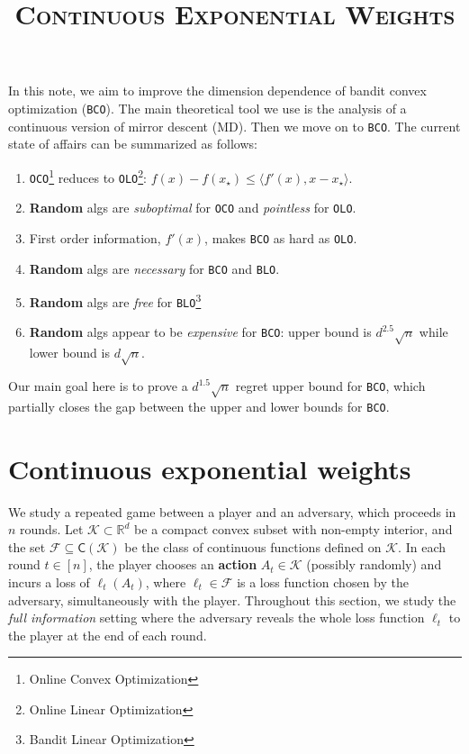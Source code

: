 \documentclass{article}
\title{\textsc{Continuous Exponential Weights}}
\date{}
\theoremstyle{plain}
\theoremstyle{definition}
\theoremstyle{plain}
\newcommand{\R}{\mathbb R}
\newcommand{\K}{\mathcal K}
\newcommand{\cF}{\mathcal F}
\newcommand{\mdalg}{\textsf{MD}\xspace}
\newcommand{\olo}{\texttt{OLO}\xspace}
\newcommand{\bco}{\texttt{BCO}\xspace}
\newcommand{\oco}{\texttt{OCO}\xspace}
\begin{document}
\maketitle

In this note, we aim to improve the dimension dependence of bandit convex optimization (\bco).
The main theoretical tool we use is the analysis of a continuous version of mirror descent (\mdalg).
Then we move on to \bco.
The current state of affairs can be summarized as follows:
\begin{enumerate}
    \item \oco\footnote{Online Convex Optimization} reduces to \olo\footnote{Online Linear Optimization}: $f(x) - f(x_\star) \leq \langle f'(x), x - x_\star \rangle$.
    \item \textbf{Random} algs are \textit{suboptimal} for \texttt{OCO} and \textit{pointless} for \texttt{OLO}.
    \item First order information, $f'(x)$, makes \texttt{BCO} as hard as \texttt{OLO}.
    \item \textbf{Random} algs are \textit{necessary} for \texttt{BCO} and \texttt{BLO}.
    \item \textbf{Random} algs are \textit{free} for \texttt{BLO}\footnote{Bandit Linear Optimization}
    \item \textbf{Random} algs appear to be \textit{expensive} for \texttt{BCO}: upper bound is $d^{2.5}\sqrt{n}$ while lower bound is $d\sqrt{n}$.
\end{enumerate}
Our main goal here is to prove a $d^{1.5} \sqrt{n}$ regret upper bound for \bco,
which partially closes the gap between the upper and lower bounds for \bco.

\newpage
\tableofcontents
\newpage

\section{Continuous exponential weights}
We study a repeated game between a player and an adversary, which proceeds in $n$ rounds.
Let $\K \subset \R^d$ be a compact convex subset with non-empty interior, and the set $\cF \subseteq \mathsf{C}(\K)$ be the class of continuous functions defined on $\K$.
In each round $t \in [n]$, the player chooses an \textbf{action} $A_t \in \K$ (possibly randomly) and incurs a loss of $\ell_t(A_t)$, where $\ell_t \in \cF$ is a loss function chosen by the adversary, simultaneously with the player.
Throughout this section, we study the \textit{full information} setting where the adversary reveals the whole loss function $\ell_t$ to the player at the end of each round.
\end{document}
